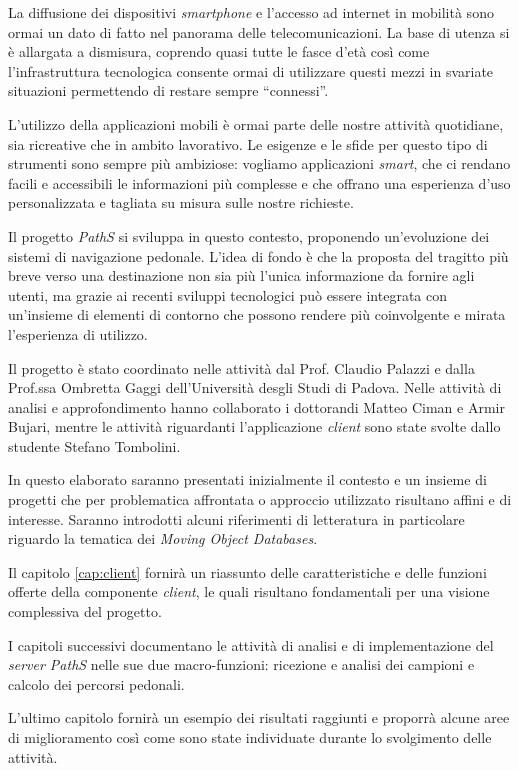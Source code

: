 La diffusione dei dispositivi \emph{smartphone} e l'accesso ad internet in mobilità sono ormai un dato di fatto nel panorama delle telecomunicazioni. La base di utenza si è allargata a dismisura, coprendo quasi tutte le fasce d'età così come l'infrastruttura tecnologica consente ormai di utilizzare questi mezzi in svariate situazioni permettendo di restare sempre ``connessi''. 

L'utilizzo della applicazioni mobili è ormai parte delle nostre attività quotidiane, sia ricreative che in ambito lavorativo. Le esigenze e le sfide per questo tipo di strumenti sono sempre più ambiziose: vogliamo applicazioni \emph{smart}, che ci rendano facili e accessibili le informazioni più complesse e che offrano una esperienza d'uso personalizzata e tagliata su misura sulle nostre richieste.

Il progetto \emph{PathS} si sviluppa in questo contesto, proponendo un'evoluzione dei sistemi di navigazione pedonale. L'idea di fondo è che la  proposta del tragitto più breve verso una destinazione non sia più l'unica informazione da fornire agli utenti, ma grazie ai recenti sviluppi tecnologici può essere integrata con un'insieme di elementi di contorno che possono rendere più coinvolgente e mirata l'esperienza di utilizzo.

Il progetto è stato coordinato nelle attività dal Prof. Claudio Palazzi e dalla Prof.ssa Ombretta Gaggi dell'Università desgli Studi di Padova. Nelle attività di analisi e approfondimento hanno collaborato i dottorandi Matteo Ciman e Armir Bujari, mentre le attività riguardanti l'applicazione \emph{client} sono state svolte dallo studente Stefano Tombolini.

In questo elaborato saranno presentati inizialmente il contesto e un insieme di progetti che per problematica affrontata o approccio utilizzato risultano affini e di interesse. Saranno introdotti alcuni riferimenti di letteratura in particolare riguardo la tematica dei \emph{Moving Object Databases}.

Il capitolo \ref{cap:client} fornirà un riassunto delle caratteristiche e delle funzioni offerte della componente \emph{client}, le quali risultano fondamentali per una visione complessiva del progetto.

I capitoli successivi documentano le attività di analisi e di implementazione del \emph{server PathS} nelle sue due macro-funzioni: ricezione e analisi dei campioni e calcolo dei percorsi pedonali.

L'ultimo capitolo fornirà un esempio dei risultati raggiunti e proporrà alcune aree di miglioramento così come sono state individuate durante lo svolgimento delle attività.
